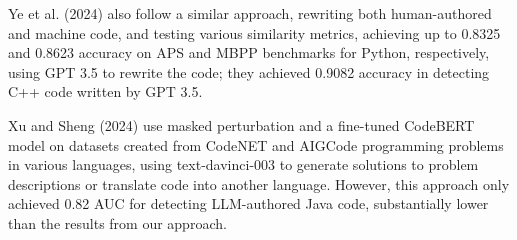 Ye et al. (2024) also %
follow a similar approach, rewriting both human-authored and machine code, and testing various similarity metrics, %
achieving up to 0.8325 and 0.8623 accuracy on APS and MBPP benchmarks for Python, respectively, using GPT 3.5 to rewrite the code; they achieved 0.9082 accuracy in detecting C++ code written by GPT 3.5. %

Xu and Sheng (2024) use masked perturbation and a fine-tuned CodeBERT model on datasets created from CodeNET and AIGCode programming problems in various languages, using text-davinci-003 to generate solutions to problem descriptions or translate code into another language. However, this approach only achieved 0.82 AUC for detecting LLM-authored Java code, 
substantially lower than the results from our approach.